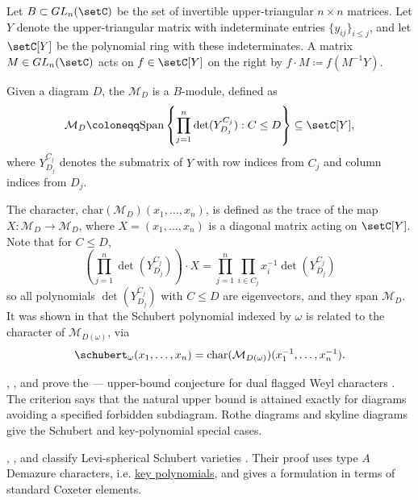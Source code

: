 Let $B \subset GL_n(\setC)$ be the set of invertible upper-triangular
$n\times n$ matrices.
Let $Y$ denote the upper-triangular matrix with indeterminate entries $\{y_{ij}\}_{i\leq j}$,
and let $\setC[Y]$ be the polynomial ring with these indeterminates.
A matrix $M \in GL_n(\setC)$ acts on $f \in \setC[Y]$ on the right by
$f \cdot M \coloneqq f(M^{-1} Y)$.

Given a diagram $D$, the \label{flaggedWeylModule}
$\mathcal{M}_D$ is a $B$-module, defined as
\[
  \mathcal{M}_D
  \coloneqq
  \mathrm{Span}
  \left\{
    \prod_{j=1}^n \det( Y_{D_j}^{C_j} ) : C \leq D
  \right\}
  \subseteq \setC[Y],
\]
where $Y_{D_j}^{C_j}$ denotes the submatrix of $Y$ with row indices from
$C_j$ and column indices from $D_j$.

The character, $\mathrm{char}(\mathcal{M}_D)(x_1,\dotsc,x_n)$, is defined as
the trace of the map $X : \mathcal{M}_D \to \mathcal{M}_D$,
where $X = (x_1,\dotsc,x_n)$ is a diagonal matrix acting on $\setC[Y]$.
Note that for $C \leq D$,
\[
\left( \prod_{j=1}^n \det( Y_{D_j}^{C_j} ) \right) \cdot X =
 \prod_{j=1}^n  \prod_{i \in C_j} x_i^{-1} \det( Y_{D_j}^{C_j} )
\]
so all polynomials $\det( Y_{D_j}^{C_j} )$ with $C \leq D$ are eigenvectors,
and they span $\mathcal{M}_D$.
It was shown in \cite{KraskiewiczPragacz1987,KraskiewiczPragacz2004}
that the Schubert polynomial indexed by $\omega$ is related to the character
of $\mathcal{M}_{D(\omega)}$, via
\[
\schubert_\omega(x_1,\dotsc,x_n) = \mathrm{char}(\mathcal{M}_{D(\omega)})(x^{-1}_1,\dotsc,x^{-1}_n).
\]

, , and
 prove the
----
 upper-bound conjecture for dual flagged Weyl characters
\cite{LinPengSun2023x}.  The criterion says that the natural upper bound is
attained exactly for diagrams avoiding a specified forbidden subdiagram.  Rothe
diagrams and skyline diagrams give the Schubert and key-polynomial special
cases.

, , and  classify
Levi-spherical Schubert varieties \cite{GaoHodgesYong2023}.  Their proof uses
type $A$ Demazure characters, i.e. \hyperref[key]{key polynomials}, and gives
a formulation in terms of standard Coxeter elements.

